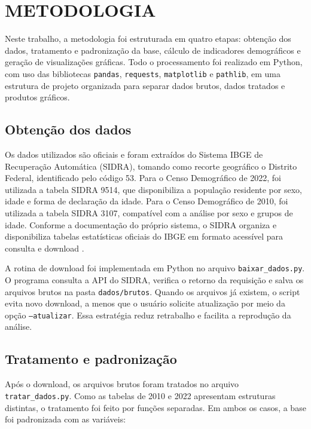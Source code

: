 \documentclass[a4paper,12pt]{article}
\begin{document}
\section{METODOLOGIA}

Neste trabalho, a metodologia foi estruturada em quatro etapas: obtenção dos dados, tratamento e padronização da base,
cálculo de indicadores demográficos e geração de visualizações gráficas. Todo o processamento foi realizado em Python,
com uso das bibliotecas \texttt{pandas}, \texttt{requests}, \texttt{matplotlib} e \texttt{pathlib}, em uma estrutura de
projeto organizada para separar dados brutos, dados tratados e produtos gráficos.

\subsection{Obtenção dos dados}

Os dados utilizados são oficiais e foram extraídos do Sistema IBGE de Recuperação Automática (SIDRA), tomando como
recorte geográfico o Distrito Federal, identificado pelo código 53. Para o Censo Demográfico de 2022, foi utilizada a
tabela SIDRA 9514, que disponibiliza a população residente por sexo, idade e forma de declaração da idade. Para o Censo
Demográfico de 2010, foi utilizada a tabela SIDRA 3107, compatível com a análise por sexo e grupos de idade.
Conforme a documentação do próprio sistema, o SIDRA organiza e disponibiliza
tabelas estatísticas oficiais do IBGE em formato acessível para consulta e
download \cite{sidra_ibge_tabelas}.

A rotina de download foi implementada em Python no arquivo \texttt{baixar\_dados.py}. O programa consulta a API do SIDRA,
verifica o retorno da requisição e salva os arquivos brutos na pasta \texttt{dados/brutos}. Quando os arquivos já existem,
o script evita novo download, a menos que o usuário solicite atualização por meio da opção \texttt{--atualizar}. Essa
estratégia reduz retrabalho e facilita a reprodução da análise.

\subsection{Tratamento e padronização}

Após o download, os arquivos brutos foram tratados no arquivo \texttt{tratar\_dados.py}. Como as tabelas de 2010 e 2022
apresentam estruturas distintas, o tratamento foi feito por funções separadas. Em ambos os casos, a base foi padronizada
com as variáveis:
\end{document}
